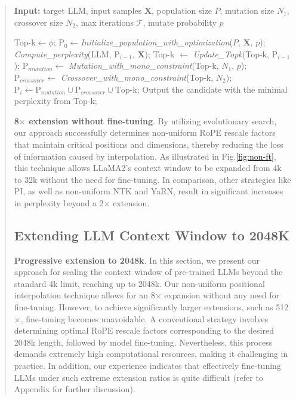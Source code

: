 \begin{abstract}
\begin{algorithm}[t]
	\small
	\caption{The search algorithm}
	\textbf{Input:} target LLM, input samples $\mathbf{X}$,   population size $P$, mutation size $N_1$, crossover size $N_2$, max iterations $\mathcal{T}$, mutate probability $p$\\

	\begin{algorithmic}[1]
		\label{alg:search}
		\STATE Top-k$\gets\phi$;
		\STATE $\text{P}_0\gets$\textit{Initialize\_population\_with\_optimization}($P$, $\mathbf{X}$, $p$);
		\STATE \textit{Compute\_perplexity}(LLM, $\text{P}_{i-1}$, $\mathbf{X}$);
		\STATE Top-k $\gets$ \textit{Update\_Topk}(Top-k, $\text{P}_{i-1}$);
		\STATE $\text{P}_{mutation} \gets$ \textit{Mutation\_with\_mono\_constraint}(Top-k, $N_1$, $p$);
		\STATE $\text{P}_{crossover} \gets$ \textit{Crossover\_with\_mono\_constraint}(Top-k, $N_2$);
		\STATE $\text{P}_i \gets \text{P}_{mutation} \cup \text{P}_{crossover} \cup \text{Top-k}$;
		\ENDFOR
		\STATE Output the candidate with the minimal perplexity from Top-k;
	\end{algorithmic}
\end{algorithm}

\textbf{8$\times$ extension without fine-tuning}. By utilizing evolutionary search, our approach successfully determines non-uniform RoPE rescale factors that maintain critical positions and dimensions, thereby reducing the loss of information caused by interpolation. As illustrated in Fig.\ref{fig:non-ft}, this technique allows LLaMA2's context window to be expanded from 4k to 32k without the need for fine-tuning. In comparison, other strategies like PI, as well as non-uniform NTK and YaRN, result in significant increases in perplexity beyond a 2$\times$ extension.

\subsection{Extending LLM Context Window to 2048K}
\label{sec:extendto2048k}

\textbf{Progressive extension to 2048k}. In this section, we present our approach for scaling the context window of pre-trained LLMs beyond the standard 4k limit, reaching up to 2048k. Our non-uniform positional interpolation technique allows for an 8$\times$ expansion without any need for fine-tuning. However, to achieve significantly larger extensions, such as 512$\times$, fine-tuning becomes unavoidable. A conventional strategy involves determining optimal RoPE rescale factors corresponding to the desired 2048k length, followed by model fine-tuning. Nevertheless, this process demands extremely high computational resources, making it challenging in practice. In addition, our experience indicates that effectively fine-tuning LLMs under such extreme extension ratios is quite difficult (refer to Appendix for further discussion).


\end{abstract}
